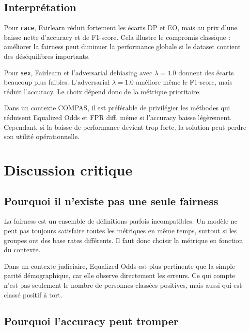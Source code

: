 \documentclass[12pt,a4paper]{report}
\begin{document}
\section{Interprétation}

Pour \texttt{race}, Fairlearn réduit fortement les écarts DP et EO, mais au prix d'une baisse nette d'accuracy et de F1-score. Cela illustre le compromis classique : améliorer la fairness peut diminuer la performance globale si le dataset contient des déséquilibres importants.

Pour \texttt{sex}, Fairlearn et l'adversarial debiasing avec $\lambda=1.0$ donnent des écarts beaucoup plus faibles. L'adversarial $\lambda=1.0$ améliore même le F1-score, mais réduit l'accuracy. Le choix dépend donc de la métrique prioritaire.

\begin{tcolorbox}[primarybox, title={Meilleur compromis prudent}]
Dans un contexte COMPAS, il est préférable de privilégier les méthodes qui réduisent Equalized Odds et FPR diff, même si l'accuracy baisse légèrement. Cependant, si la baisse de performance devient trop forte, la solution peut perdre son utilité opérationnelle.
\end{tcolorbox}

\chapter{Discussion critique}

\section{Pourquoi il n'existe pas une seule fairness}

La fairness est un ensemble de définitions parfois incompatibles. Un modèle ne peut pas toujours satisfaire toutes les métriques en même temps, surtout si les groupes ont des base rates différents. Il faut donc choisir la métrique en fonction du contexte.

\begin{tcolorbox}[infobox]
Dans un contexte judiciaire, Equalized Odds est plus pertinente que la simple parité démographique, car elle observe directement les erreurs. Ce qui compte n'est pas seulement le nombre de personnes classées positives, mais aussi qui est classé positif à tort.
\end{tcolorbox}

\section{Pourquoi l'accuracy peut tromper}
\end{document}

